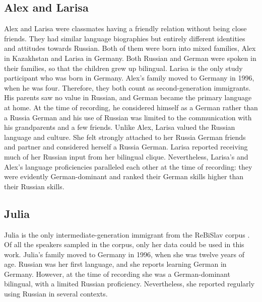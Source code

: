 \subsection{Alex and Larisa}
Alex and Larisa were classmates having a friendly relation without being close friends. They had similar language biographies but entirely different identities and attitudes towards Russian. Both of them were born into mixed families, Alex in Kazakhstan and Larisa in Germany. Both Russian and German were spoken in their families, so that the children grew up bilingual. Larisa is the only study participant who was born in Germany. Alex's family moved to Germany in 1996, when he was four. Therefore, they both count as second-generation immigrants. His parents saw no value in Russian, and German became the primary language at home. At the time of recording, he considered himself as a German rather than a Russia German and his use of Russian was limited to the communication with his grandparents and a few friends. Unlike Alex, Larisa valued the Russian language and culture. She felt strongly attached to her Russia German friends and partner and considered herself a Russia German. Larisa reported receiving much of her Russian input from her bilingual clique. Nevertheless, Larisa's and Alex's language proficiencies paralleled each other at the time of recording: they were evidently German-dominant and ranked their German skills higher than their Russian skills.

\subsection{Julia}
Julia is the only intermediate-generation immigrant from the ReBiSlav corpus \citep{rebislav}. Of all the speakers sampled in the corpus, only her data could be used in this work. Julia's family moved to Germany in 1996, when she was twelve years of age. Russian was her first language, and she reports learning German in Germany. However, at the time of recording she was a German-dominant bilingual, with a limited Russian proficiency. Nevertheless, she reported regularly using Russian in several contexts.

